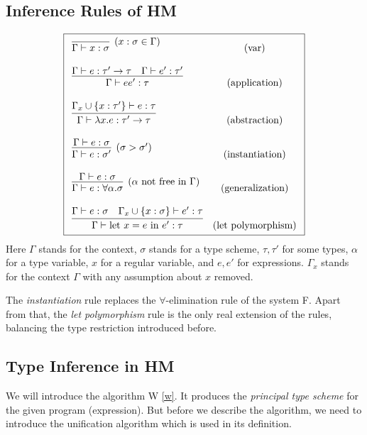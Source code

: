 \subsection{Inference Rules of HM}

\begin{defn}
    $$\boxed{\begin{array}{l c}
        \infer[(x : \sigma \in \Gamma)]{\Gamma \vdash x : \sigma}{} & (\text{var}) \\\\
        \infer{\Gamma \vdash e e' : \tau}{\Gamma \vdash e : \tau' \rightarrow \tau \quad \Gamma \vdash e' : \tau'} & (\text{application}) \\\\
        \infer{\Gamma \vdash \lambda x . e : \tau' \rightarrow \tau}{\Gamma_x \cup \{x : \tau'\} \vdash e : \tau} & (\text{abstraction}) \\\\
        \infer[(\sigma > \sigma')]{\Gamma \vdash e : \sigma'}{\Gamma \vdash e : \sigma} & (\text{instantiation}) \\\\
        \infer[(\alpha \text{ not free in }\Gamma)]{\Gamma \vdash e : \forall \alpha . \sigma}{\Gamma \vdash e : \sigma} & (\text{generalization}) \\\\
        \infer{\Gamma \vdash \text{let } x = e \text{ in } e' : \tau}{\Gamma \vdash e : \sigma \quad \Gamma_x \cup \{x :\sigma\} \vdash e' : \tau} & (\text{let polymorphism})
    \end{array}}$$
    Here $\Gamma$ stands for the context, $\sigma$ stands for a type scheme, $\tau, \tau'$ for some types, $\alpha$ for a type variable, $x$ for a regular variable, and $e, e'$ for expressions. $\Gamma_x$ stands for the context $\Gamma$ with any assumption about $x$ removed.
\end{defn}

The \emph{instantiation} rule replaces the $\forall$-elimination rule of the system F. Apart from that, the \emph{let polymorphism} rule is the only real extension of the rules, balancing the type restriction introduced before.

\subsection{Type Inference in HM}

We will introduce the algorithm W \ref{w}. It produces the \emph{principal type scheme} for the given program (expression). But before we describe the algorithm, we need to introduce the unification algorithm which is used in its definition.

